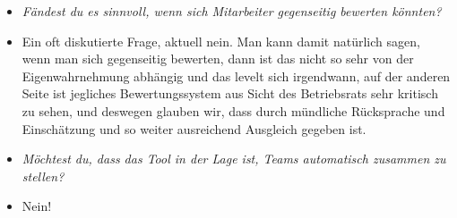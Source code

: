 \begin{itemize}
\item[] \textit{Fändest du es sinnvoll, wenn sich Mitarbeiter gegenseitig bewerten könnten?}
\item[] Ein oft diskutierte Frage, aktuell nein. Man kann damit natürlich sagen, wenn man sich gegenseitig bewerten, dann ist das nicht so sehr von der Eigenwahrnehmung abhängig und das levelt sich irgendwann, auf der anderen Seite ist jegliches Bewertungssystem aus Sicht des Betriebsrats sehr kritisch zu sehen, und deswegen glauben wir, dass durch mündliche Rücksprache und Einschätzung und so weiter ausreichend Ausgleich gegeben ist.

\item[] \textit{Möchtest du, dass das Tool in der Lage ist, Teams automatisch zusammen zu stellen?}
\item[] Nein!
\end{itemize}











